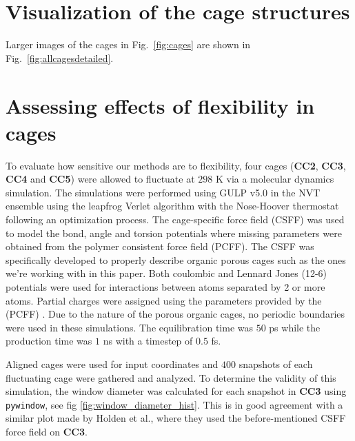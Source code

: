 \documentclass[journal=jacsat,manuscript=article]{achemso}
\begin{document}
\newpage
\clearpage


\section{Visualization of the cage structures}
Larger images of the cages in Fig.~\ref{fig:cages} are shown in Fig.~\ref{fig:allcagesdetailed}.
\captionsetup[subfigure]{labelformat=empty} %


\newpage
\clearpage


\section{Assessing effects of flexibility in cages}

To evaluate how sensitive our methods are to flexibility, four cages (\textbf{CC2}, \textbf{CC3}, \textbf{CC4} and \textbf{CC5}) were allowed to fluctuate at $298$ K via a molecular dynamics simulation. The simulations were performed using GULP v5.0 \cite{julian2003gulp} in the NVT ensemble using the leapfrog Verlet algorithm with the Nose-Hoover thermostat following an optimization process. The cage-specific force field (CSFF) was used to model the bond, angle and torsion potentials \cite{holden2012bespoke} where missing parameters were obtained from the polymer consistent force field (PCFF). The CSFF was specifically developed to properly describe organic porous cages such as the ones we're working with in this paper. Both coulombic and Lennard Jones (12-6) potentials were used for interactions between atoms separated by 2 or more atoms. Partial charges were assigned using the parameters provided by the (PCFF) \cite{sun1998compass}\cite{holden2012bespoke} . Due to the nature of the porous organic cages, no periodic boundaries were used in these simulations. The equilibration time was $50$ ps while the production time was $1$ ns with a timestep of $0.5$ fs.

Aligned cages were used for input coordinates and $400$ snapshots of each fluctuating cage were gathered and analyzed. To determine the validity of this simulation, the window diameter was calculated for each snapshot in \textbf{CC3} using \texttt{pywindow}, see fig \ref{fig:window_diameter_hist}. This is in good agreement with a similar plot made by Holden et al.\cite{holden2012bespoke}, where they used the before-mentioned CSFF force field on \textbf{CC3}.
\end{document}
